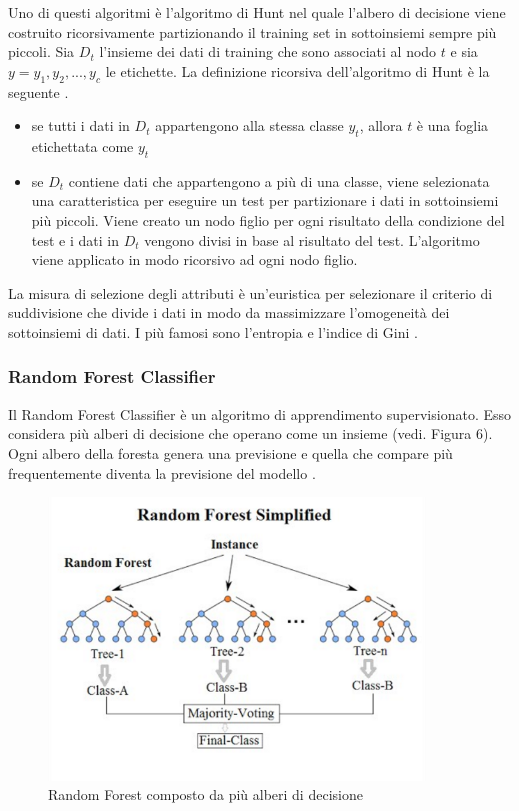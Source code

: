 \documentclass[12pt,italian]{report}
\begin{document}
Uno di questi algoritmi è l'algoritmo di Hunt nel quale l'albero di decisione viene costruito ricorsivamente partizionando il training set in sottoinsiemi sempre più piccoli. Sia $D_t$ l'insieme dei dati di training che sono associati al nodo $t$ e sia $y = {y_1, y_2,...,y_c}$ le etichette. La definizione ricorsiva dell'algoritmo di Hunt è la seguente \cite{Introductiontodatamining}.
\begin{itemize}
	\item se tutti i dati in $D_t$ appartengono alla stessa classe $y_t$, allora $t$ è una foglia etichettata come $y_t$
	\item se $D_t$ contiene dati che appartengono a più di una classe, viene selezionata una caratteristica per eseguire un test per partizionare i dati in sottoinsiemi più piccoli. Viene creato un nodo figlio per ogni risultato della condizione del test e i dati in $D_t$ vengono divisi in base al risultato del test. L'algoritmo viene applicato in modo ricorsivo ad ogni nodo figlio.
\end{itemize}

La misura di selezione degli attributi è un'euristica per selezionare il criterio di suddivisione che divide i dati in modo da massimizzare l'omogeneità dei sottoinsiemi di dati. I più famosi sono l'entropia e l'indice di Gini \cite{DataMiningandKnowledgeDiscoveryHandbook}.

\subsubsection{Random Forest Classifier}
Il Random Forest Classifier è un algoritmo di apprendimento supervisionato. Esso considera più alberi di decisione che operano come un insieme (vedi. Figura 6). Ogni albero della foresta genera una previsione e quella che compare più frequentemente diventa la previsione del modello \cite{RandomForest}.

\begin{figure}
	\centering
	\includegraphics[width = 100mm]{immagini/randomForest}
	\caption{Random Forest composto da più alberi di decisione}
\end{figure}
\end{document}
